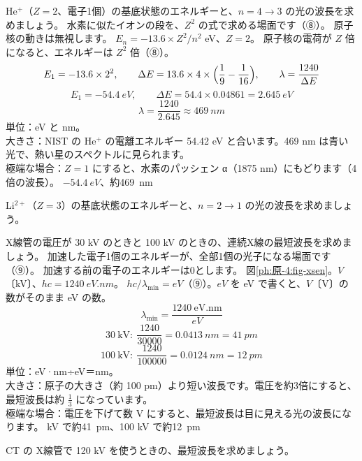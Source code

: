 \label{ph:原-4:ex7}
\begin{phreidai}[ヘリウムのイオン He$^{+}$]
He$^{+}$（$Z=2$、電子1個）の基底状態のエネルギーと、$n=4\to3$ の光の波長を求めましょう。
\phbamen
水素に似たイオンの段を、$Z^2$ の式で求める場面です（⑧）。
\phmushi
原子核の動きは無視します。
\phzu
$E_n=-13.6\times Z^2/n^2$ eV、$Z=2$。
\phriyu
原子核の電荷が $Z$ 倍になると、エネルギーは $Z^2$ 倍（⑧）。
\phtateru
\[ E_1=-13.6\times2^2,\qquad\Delta E=13.6\times4\times\Bigl(\frac19-\frac{1}{16}\Bigr),\qquad\lambda=\frac{1240}{\Delta E} \]
\phtoku
\[ E_1=\qty{-54.4}{eV},\qquad\Delta E=54.4\times0.04861=\qty{2.645}{eV} \]
\[ \lambda=\frac{1240}{2.645}\approx\qty{469}{nm} \]
\phtashikame
単位：eV と nm。\\
大きさ：NIST の He$^{+}$ の電離エネルギー 54.42 eV と合います。469 nm は青い光で、熱い星のスペクトルに見られます。\\
極端な場合：$Z=1$ にすると、水素のパッシェン α（1875 nm）にもどります（4倍の波長）。
\kotae $\qty{-54.4}{eV}$、約\qty{469}{nm}
\end{phreidai}
\begin{jibun}
Li$^{2+}$（$Z=3$）の基底状態のエネルギーと、$n=2\to1$ の光の波長を求めましょう。
\end{jibun}

\label{ph:原-4:ex8}
\begin{phreidai}[X線管の最短波長]
X線管の電圧が 30 kV のときと 100 kV のときの、連続X線の最短波長を求めましょう。
\phbamen
加速した電子1個のエネルギーが、全部1個の光子になる場面です（⑨）。
\phmushi
加速する前の電子のエネルギーは0とします。
\phzu
図\ref{ph:原-4:fig-xsen}。$V$〔kV〕、$hc=\qty{1240}{eV.nm}$。
\phriyu
$hc/\lambda_{\min}=eV$（⑨）。$eV$ を eV で書くと、$V$〔V〕の数がそのまま eV の数。
\phtateru
\[ \lambda_{\min}=\frac{1240\ \mathrm{eV.nm}}{eV} \]
\phtoku
\[ 30\ \mathrm{kV}:\ \frac{1240}{\num{30000}}=\qty{0.0413}{nm}=\qty{41}{pm} \]
\[ 100\ \mathrm{kV}:\ \frac{1240}{\num{100000}}=\qty{0.0124}{nm}=\qty{12}{pm} \]
\phtashikame
単位：eV·nm÷eV＝nm。\\
大きさ：原子の大きさ（約 100 pm）より短い波長です。電圧を約3倍にすると、最短波長は約 $\tfrac13$ になっています。\\
極端な場合：電圧を下げて数 V にすると、最短波長は目に見える光の波長になります。
 kV で約\qty{41}{pm}、100 kV で約\qty{12}{pm}
\end{phreidai}
\begin{jibun}
CT の X線管で 120 kV を使うときの、最短波長を求めましょう。
\end{jibun}

